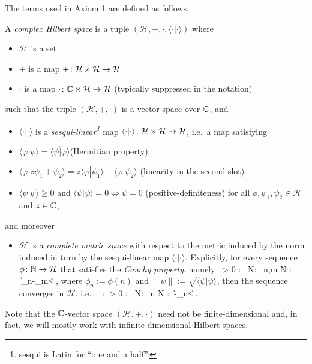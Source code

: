 The terms used in Axiom 1 are defined as follows.

\bd
A \emph{complex Hilbert space} is a tuple $(\mathcal{H},+,\cdot,\langle \cdot | \cdot \rangle)$ where
\begin{itemize}
\item $\mathcal{H}$ is a set
\item $+$ is a map $+\colon\mathcal{H}\times \mathcal{H}\to \mathcal{H}$
\item $\cdot$ is a map $\cdot \colon \mathbb{C} \times \mathcal{H}\to \mathcal{H}$ (typically suppressed in the notation)
\end{itemize}
such that the triple $(\mathcal{H},+,\cdot)$ is a vector space over $\mathbb{C}$, and
\begin{itemize}
\item $\langle \cdot | \cdot \rangle$ is a \emph{sesqui-linear\footnote{sesqui is Latin for ``one and a half''.}} map $\langle \cdot | \cdot \rangle\colon\mathcal{H}\times \mathcal{H}\to \mathcal{H}$, i.e.\ a map satisfying
\ben[label=(\roman*)]
\item $\langle \varphi|\psi\rangle=\overline{\langle \psi|\varphi\rangle}$\hfill (Hermitian property)
\item $\langle \varphi|z\psi_1+\psi_2\rangle=z\langle \varphi|\psi_1\rangle+\langle \varphi|\psi_2\rangle$ \hfill (linearity in the second slot)
\item $\langle \psi | \psi\rangle \geq 0$ and $\langle \psi|\psi\rangle = 0 \Leftrightarrow \psi = 0$ \hfill (positive-definiteness)
\een
for all $\phi,\psi_1,\psi_2\in\mathcal{H}$ and $z\in \mathbb{C}$,
\end{itemize}
and moreover
\begin{itemize}
\item $\mathcal{H}$ is a \emph{complete metric space} with respect to the metric induced by the norm induced in turn by the sesqui-linear map $\langle \cdot | \cdot \rangle$. Explicitly, for every sequence $\phi\colon \mathbb{N} \to \mathcal{H}$ that satisfies the \emph{Cauchy property}, namely
\bse
\forall \, \varepsilon > 0 : \exists \, N\in \N : \forall \, n,m \geq N : \ \|\phi_n-\phi_m\|< \varepsilon,
\ese
where $\phi_n:=\phi(n)$ and $\|\psi\|:=\sqrt{\langle \psi | \psi \rangle}$, then the sequence converges in $\mathcal{H}$, i.e.\
\bse
\exists \, \varphi\in{}:\forall \, \varepsilon > 0 : \exists \, N\in \N : \forall \, n \geq N : \ \|\varphi-\phi_n\|< \varepsilon.
\ese
\end{itemize}
\ed
Note that the $\mathbb{C}$-vector space $(\mathcal{H},+,\cdot)$ need not be finite-dimensional and, in fact, we will mostly work with infinite-dimensional Hilbert spaces. 

